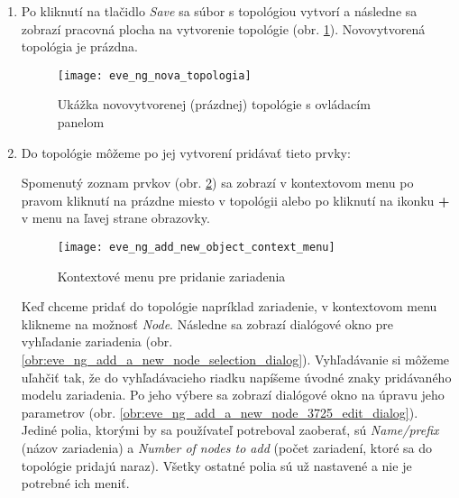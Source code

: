 \begin{enumerate}[noitemsep]
    \item Po kliknutí na tlačidlo \emph{Save} sa súbor s topológiou vytvorí a následne sa zobrazí pracovná plocha na vytvorenie topológie (obr. \ref{obr:eve_ng_nova_topologia}). Novovytvorená topológia je prázdna.

\begin{figure}
    \centering
    \texttt{[image: eve\_ng\_nova\_topologia]}
    \caption{Ukážka novovytvorenej (prázdnej) topológie s ovládacím panelom}
    \label{obr:eve_ng_nova_topologia}
\end{figure}

    \item Do topológie môžeme po jej vytvorení pridávať tieto prvky:
    
    
    Spomenutý zoznam prvkov (obr. \ref{obr:eve_ng_add_new_object_context_menu}) sa zobrazí v kontextovom menu po pravom kliknutí na prázdne miesto v topológii alebo po kliknutí na ikonku \textbf{+} v menu na ľavej strane obrazovky.
    
\begin{figure}
    \centering
    \texttt{[image: eve\_ng\_add\_new\_object\_context\_menu]}
    \caption{Kontextové menu pre pridanie zariadenia}
    \label{obr:eve_ng_add_new_object_context_menu}
\end{figure}
    
    Keď chceme pridať do topológie napríklad zariadenie, v kontextovom menu klikneme na možnosť \emph{Node}. Následne sa zobrazí dialógové okno pre vyhľadanie zariadenia (obr. \ref{obr:eve_ng_add_a_new_node_selection_dialog}). Vyhľadávanie si môžeme uľahčiť tak, že do vyhľadávacieho riadku napíšeme úvodné znaky pridávaného modelu zariadenia. Po jeho výbere sa zobrazí dialógové okno na úpravu jeho parametrov (obr. \ref{obr:eve_ng_add_a_new_node_3725_edit_dialog}). Jediné polia, ktorými by sa používateľ potreboval zaoberať, sú \emph{Name/prefix} (názov zariadenia) a \emph{Number of nodes to add} (počet zariadení, ktoré sa do topológie pridajú naraz). Všetky ostatné polia sú už nastavené a nie je potrebné ich meniť.
    

\end{enumerate}
